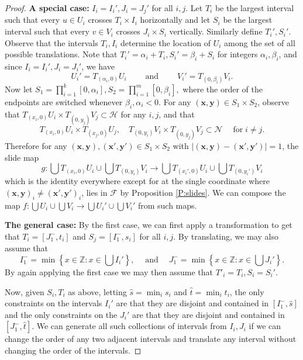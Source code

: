 \documentclass[aop, preprint]{imsart}
\theoremstyle{plain}
\theoremstyle{definition}
\theoremstyle{plain}
\newcommand{\sset}{\subset}
\newcommand{\al}{\alpha}
\newcommand{\mathand}{\;\text{and}\;}
\newcommand{\mathfor}{\;\text{for}\;}
\newcommand{\be}{\beta}
\newcommand{\scrH}{\mathcal{H}}
\newcommand{\scrN}{\mathcal{N}}
\newcommand{\scrF}{\mathcal{F}}
\newcommand{\Z}{\mathds{Z}}
\newcommand{\X}{\times}
\newcommand{\lf}{\left}
\newcommand{\rg}{\right}
\newcommand{\bx}{\mathbf{x}}
\newcommand{\by}{\mathbf{y}}
\begin{document}
\begin{proof}
	\textbf{A special case:} $I_i = I_i', J_i = J_j'$ for all $i, j$. \qquad Let $T_i$ be the largest interval such that every $u \in U_i$ crosses $T_i \X I_i$ horizontally and let $S_i$ be the largest interval such that every $v \in V_i$ crosses $J_i \X S_i$ vertically. Similarly define $T_i', S_i'$. Observe that the intervals $T_i, I_i$ determine the location of $U_i$ among the set of all possible translations. Note that $T_i' = \al_i + T_i, S_i' = \be_i + S_i$ for integers $\al_i, \be_i$, and since $I_i = I_i', J_i = J_i'$, we have
	$$
	U_i' = T_{(\al_i, 0)} U_i \qquad \mathand \qquad  V_i' = T_{(0, \be_i)} V_i.
	$$
	Now let $S_1 = \prod_{i=1}^k [0, \al_i], S_2 =  \prod_{i=1}^m [0, \be_i],$ where the order of the endpoints are switched whenever $\be_i, \al_i < 0$.
	For any $(\bx, \by) \in S_1 \X S_2$, observe that $T_{(x_i, 0)} U_i \X T_{(0, y_j)} V_j \sset \scrH$ for any $i, j$, and that 
	$$
	T_{(x_i, 0)} U_i \X T_{(x_j, 0)} U_j, \quad T_{(0, y_i)} V_i \X T_{(0, y_j)} V_j \sset \scrN \quad \mathfor i \ne j.
	$$ 
	Therefore 
	for any $(\bx, \by), (\bx', \by') \in S_1 \X S_2$ with $|(\bx, \by) - (\bx', \by')| = 1$, the slide map
	$$
	g:\bigcup T_{(x_i, 0)} U_i \cup \bigcup T_{(0, y_i)} V_i \to \bigcup T_{(x_i', 0)} U_i \cup \bigcup T_{(0, y_i')} V_i
	$$
	which is the identity everywhere except for at the single coordinate where $(\bx, \by)_i \ne (\bx', \by')_i$, lies in $\scrF$ by Proposition \ref{P:slides}. We can compose the map $f:\bigcup U_i \cup \bigcup V_i \to \bigcup U_i' \cup \bigcup V_i'$ from such maps.
	
	\textbf{The general case:} \qquad By the first case, we can first apply a transformation to get that $T_i = [J_1^-, t_i]$ and $S_j = [I_1^-, s_i]$ for all $i, j$. By translating, we may also assume that 
	$$
	I_1^- = \min \lf\{x \in \Z: x \in \bigcup I_i' \rg\}, \quad \mathand \quad J_1^- = \min \lf\{x \in \Z: x \in \bigcup J_i' \rg\}.
	$$
	By again applying the first case we may then assume that $T'_i = T_i, S_i = S_i'$.
	
	Now, given $S_i, T_i$ as above, letting $\hat s = \min_i s_i$ and $\hat t = \min_i t_i$, the only constraints on the intervals $I_i'$ are that they are disjoint and contained in $[I_1^-, \hat s]$ and the only constraints on the $J_i'$ are that they are disjoint and contained in $[J_1^-, \hat t]$. We can generate all such collections of intervals from $I_i, J_i$ if we can change the order of any two adjacent intervals and translate any interval without changing the order of the intervals. 
	

\end{proof}
\end{document}
